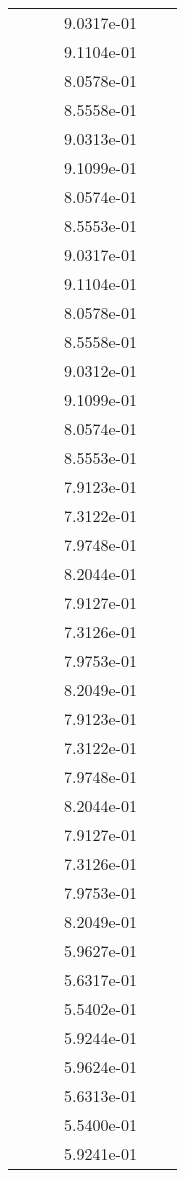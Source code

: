 \begin{xltabular}{\textwidth}{r|rS[table-format=1.3e+2]S[table-format=1.4e+2]S[table-format=1.4e+2]S[table-format=-1.5]}
&  &  & 9.0317e-01 & & \\
&  &  & 9.1104e-01 & & \\
&  &  & 8.0578e-01 & & \\
&  &  & 8.5558e-01 & & \\
&  &  & 9.0313e-01 & & \\
&  &  & 9.1099e-01 & & \\
&  &  & 8.0574e-01 & & \\
&  &  & 8.5553e-01 & & \\
&  &  & 9.0317e-01 & & \\
&  &  & 9.1104e-01 & & \\
&  &  & 8.0578e-01 & & \\
&  &  & 8.5558e-01 & & \\
&  &  & 9.0312e-01 & & \\
&  &  & 9.1099e-01 & & \\
&  &  & 8.0574e-01 & & \\
&  &  & 8.5553e-01 & & \\
&  &  & 7.9123e-01 & & \\
&  &  & 7.3122e-01 & & \\
&  &  & 7.9748e-01 & & \\
&  &  & 8.2044e-01 & & \\
&  &  & 7.9127e-01 & & \\
&  &  & 7.3126e-01 & & \\
&  &  & 7.9753e-01 & & \\
&  &  & 8.2049e-01 & & \\
&  &  & 7.9123e-01 & & \\
&  &  & 7.3122e-01 & & \\
&  &  & 7.9748e-01 & & \\
&  &  & 8.2044e-01 & & \\
&  &  & 7.9127e-01 & & \\
&  &  & 7.3126e-01 & & \\
&  &  & 7.9753e-01 & & \\
&  &  & 8.2049e-01 & & \\
&  &  & 5.9627e-01 & & \\
&  &  & 5.6317e-01 & & \\
&  &  & 5.5402e-01 & & \\
&  &  & 5.9244e-01 & & \\
&  &  & 5.9624e-01 & & \\
&  &  & 5.6313e-01 & & \\
&  &  & 5.5400e-01 & & \\
&  &  & 5.9241e-01 & & \\

\end{xltabular}
